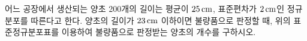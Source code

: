 \noindent\begin{minipage}[t]{0.58\linewidth}\vspace{0pt}\raggedright 어느 공장에서 생산되는 양초 200개의 길이는 평균이 $25\mkern3mu \mathrm{cm}$, 표준편차가 $2\mkern3mu \mathrm{cm}$인 정규분포를 따른다고 한다. 양초의 길이가 $23\mkern3mu \mathrm{cm}$ 이하이면 불량품으로 판정할 때, 위의 표준정규분포표를 이용하여 불량품으로 판정받는 양초의 개수를 구하시오.\end{minipage}\hfill\begin{minipage}[t]{0.4\linewidth}\vspace{0pt}\centering \resizebox{\ifdim\width>\linewidth\linewidth\else\width\fi}{!}{}\end{minipage}\par
